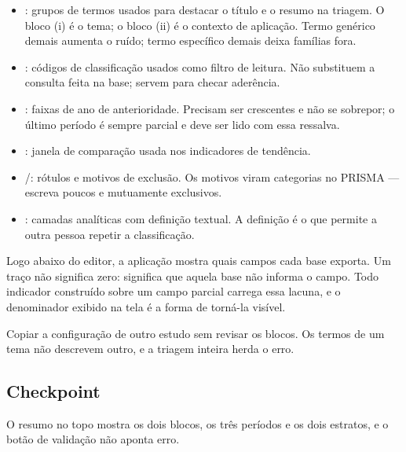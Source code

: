 \begin{itemize}
\item {}: grupos de termos usados para destacar o título e o resumo na triagem. O bloco
      (i) é o tema; o bloco (ii) é o contexto de aplicação. Termo genérico demais aumenta o ruído;
      termo específico demais deixa famílias fora.
\item {}: códigos de classificação usados como filtro de leitura. Não
      substituem a consulta feita na base; servem para checar aderência.
\item {}: faixas de ano de anterioridade. Precisam ser crescentes e não se sobrepor;
      o último período é sempre parcial e deve ser lido com essa ressalva.
\item {}: janela de comparação usada nos indicadores de tendência.
\item {}/: rótulos e motivos de exclusão. Os motivos viram categorias no
      PRISMA --- escreva poucos e mutuamente exclusivos.
\item {}: camadas analíticas com definição textual. A definição é o que permite a outra
      pessoa repetir a classificação.
\end{itemize}

\begin{nota}
Logo abaixo do editor, a aplicação mostra quais campos cada base exporta. Um traço não significa
zero: significa que aquela base não informa o campo. Todo indicador construído sobre um campo parcial
carrega essa lacuna, e o denominador exibido na tela é a forma de torná-la visível.
\end{nota}

\begin{alerta}
Copiar a configuração de outro estudo sem revisar os blocos. Os termos de um tema não descrevem outro,
e a triagem inteira herda o erro.
\end{alerta}

\subsection*{Checkpoint}
\marcador\; O resumo no topo mostra os dois blocos, os três períodos e os dois estratos, e o botão de
validação não aponta erro.
